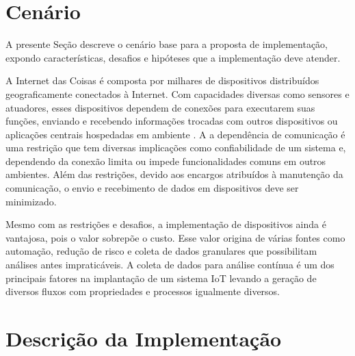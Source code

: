 
\section{Cenário}\label{sec:cenario}

A presente Seção descreve o cenário base para a proposta de implementação,
expondo características, desafios e hipóteses que a implementação deve atender.

A Internet das Coisas \iot é composta por milhares de dispositivos distribuídos
geograficamente conectados à Internet.
Com capacidades diversas como sensores e atuadores, esses dispositivos dependem
de conexões para executarem suas funções, enviando e recebendo informações
trocadas com outros dispositivos ou aplicações centrais hospedadas em ambiente
\cloud.
A a dependência de comunicação é uma restrição que tem diversas implicações
como confiabilidade de um sistema e, dependendo da conexão limita ou impede
funcionalidades comuns em outros ambientes.
Além das restrições, devido aos encargos atribuídos à manutenção da comunicação,
o envio e recebimento de dados em dispositivos deve ser minimizado.


Mesmo com as restrições e desafios, a implementação de dispositivos ainda é
vantajosa, pois o valor sobrepõe o custo.
Esse valor origina de várias fontes como automação, redução de risco e coleta
de dados granulares que possibilitam análises antes impraticáveis.
A coleta de dados para análise contínua é um dos principais fatores na
implantação de um sistema IoT levando a geração de diversos fluxos com
propriedades e processos igualmente diversos.



\section{Descrição da Implementação}\label{sec:descricao}

\newcommand{\source}{\emph{source}\xspace}
\newcommand{\sink}{\emph{sink}\xspace}

